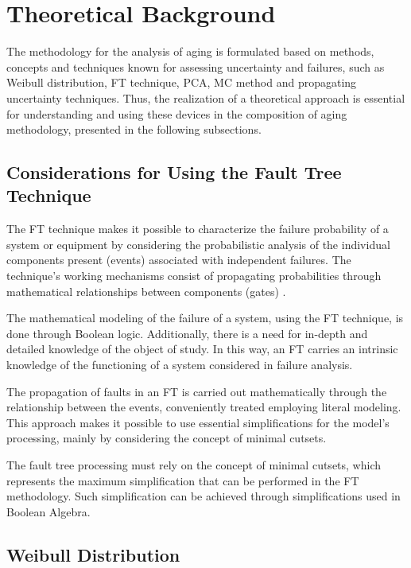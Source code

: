\documentclass{ws-m3as}
\begin{document}
\section{Theoretical Background}

The methodology for the analysis of aging is formulated based on methods, concepts and techniques known for assessing uncertainty and failures, such as Weibull distribution, FT technique, PCA, MC method and propagating uncertainty techniques. Thus, the realization of a theoretical approach is essential for understanding and using these devices in the composition of aging methodology, presented in the following subsections.


\subsection{Considerations for Using the Fault Tree Technique}

The FT technique makes it possible to characterize the failure probability of a system or equipment by considering the probabilistic analysis of the individual components present (events) associated with independent failures. The technique's working mechanisms consist of propagating probabilities through mathematical relationships between components (gates) \cite{Borges2015}.

The mathematical modeling of the failure of a system, using the FT technique, is done through Boolean logic. Additionally, there is a need for in-depth and detailed knowledge of the object of study. In this way, an FT carries an intrinsic knowledge of the functioning of a system  considered in failure analysis.

The propagation of faults in an FT is carried out mathematically through the relationship between the events, conveniently treated employing literal modeling. This approach makes it possible to use essential simplifications for the model's processing, mainly by considering the concept of minimal cutsets.

The fault tree processing must rely on the concept of minimal cutsets, which represents the maximum simplification that can be performed in the FT methodology. Such simplification can be achieved through simplifications used in Boolean Algebra.

\subsection{Weibull Distribution}
\end{document}
